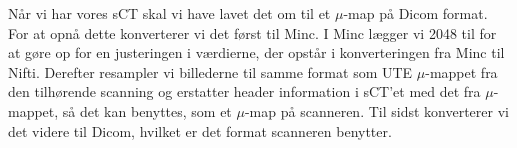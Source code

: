 Når vi har vores sCT skal vi have lavet det om til et $\mu$-map
på Dicom format. For at opnå dette konverterer vi det først til
Minc. I Minc lægger vi 2048 til for at gøre op for en justeringen i
værdierne, der opstår i konverteringen fra Minc til Nifti. Derefter
resampler vi billederne til samme format som UTE $\mu$-mappet fra den
tilhørende scanning og erstatter header information i sCT'et med det fra
$\mu$-mappet, så det kan benyttes, som et $\mu$-map på scanneren. Til
sidst konverterer vi det videre til Dicom, hvilket er det format scanneren benytter.

